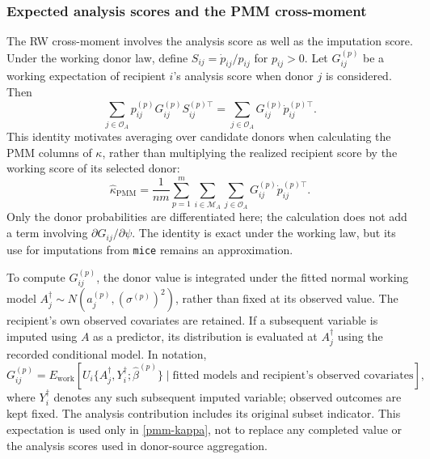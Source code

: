 \subsubsection{Expected analysis scores and the PMM cross-moment}
The RW cross-moment involves the analysis score as well as the
imputation score. Under the working donor law, define
\(S_{ij}=\dot p_{ij}/p_{ij}\) for \(p_{ij}>0\). Let \(G_{ij}^{(p)}\)
be a working expectation of recipient \(i\)'s analysis score when
donor \(j\) is considered. Then
\[
\sum_{j\in\mathcal O_A}p_{ij}^{(p)}G_{ij}^{(p)}S_{ij}^{(p)\top}
=\sum_{j\in\mathcal O_A}G_{ij}^{(p)}\dot p_{ij}^{(p)\top}.
\]
This identity motivates averaging over candidate donors when calculating
the PMM columns of \(\kappa\), rather than multiplying the realized
recipient score by the working score of its selected donor:
\begin{equation}
\widehat\kappa_{\mathrm{PMM}}
=\frac{1}{nm}\sum_{p=1}^m\sum_{i\in\mathcal M_A}
\sum_{j\in\mathcal O_A}G_{ij}^{(p)}\dot p_{ij}^{(p)\top}.
\label{pmm-kappa}
\end{equation}
Only the donor probabilities are differentiated here; the calculation
does not add a term involving \(\partial G_{ij}/\partial\psi\).
The identity is exact under the working law, but its use for imputations
from \texttt{mice} remains an approximation.

To compute \(G_{ij}^{(p)}\), the donor value is integrated under the
fitted normal working model
\(A_j^\dagger\sim N(a_j^{(p)},(\sigma^{(p)})^2)\), rather than fixed
at its observed value. The recipient's own observed covariates are
retained. If a subsequent variable is imputed using \(A\) as a predictor,
its distribution is evaluated at \(A_j^\dagger\) using the recorded
conditional model. In notation,
\[
G_{ij}^{(p)}
=E_{\mathrm{work}}\!\left[
U_i\{A_j^\dagger,Y_i^\dagger;\hat\beta^{(p)}\}
\mid\text{fitted models and recipient's observed covariates}
\right],
\]
where \(Y_i^\dagger\) denotes any such subsequent imputed variable;
observed outcomes are kept fixed. The analysis contribution includes its
original subset indicator. This expectation is used only in
\eqref{pmm-kappa}, not to replace any completed value or the analysis
scores used in donor-source aggregation.

